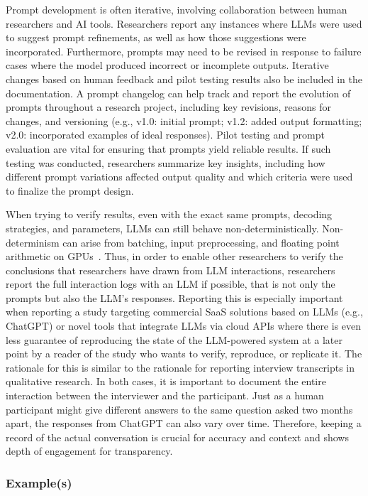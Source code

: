 Prompt development is often iterative, involving collaboration between human researchers and AI tools.
Researchers \should report any instances where LLMs were used to suggest prompt refinements, as well as how those suggestions were incorporated.
Furthermore, prompts may need to be revised in response to failure cases where the model produced incorrect or incomplete outputs.
Iterative changes based on human feedback and pilot testing results \should also be included in the documentation.
A prompt changelog can help track and report the evolution of prompts throughout a research project, including key revisions, reasons for changes, and versioning (e.g., v1.0: initial prompt; v1.2: added output formatting; v2.0: incorporated examples of ideal responses).
Pilot testing and prompt evaluation are vital for ensuring that prompts yield reliable results. If such testing was conducted, researchers \should summarize key insights, including how different prompt variations affected output quality and which criteria were used to finalize the prompt design.

When trying to verify results, even with the exact same prompts, decoding strategies, and parameters, LLMs can still behave non-deterministically.
Non-determinism can arise from batching, input preprocessing, and floating point arithmetic on GPUs~\cite{Chann2023}.
Thus, in order to enable other researchers to verify the conclusions that researchers have drawn from LLM interactions, researchers \should report the full interaction logs with an LLM if possible, that is not only the prompts but also the LLM's responses.
Reporting this is especially important when reporting a study targeting commercial SaaS solutions based on LLMs (e.g., ChatGPT) or novel tools that integrate LLMs via cloud APIs where there is even less guarantee of reproducing the state of the LLM-powered system at a later point by a reader of the study who wants to verify, reproduce, or replicate it. 
The rationale for this is similar to the rationale for reporting interview transcripts in qualitative research.
In both cases, it is important to document the entire interaction between the interviewer and the participant.
Just as a human participant might give different answers to the same question asked two months apart, the responses from ChatGPT can also vary over time.
Therefore, keeping a record of the actual conversation is crucial for accuracy and context and shows depth of engagement for transparency.


\subsubsection{Example(s)}

